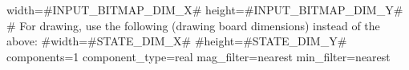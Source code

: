 width=#INPUT_BITMAP_DIM_X#
height=#INPUT_BITMAP_DIM_Y#
# For drawing, use the following (drawing board dimensions) instead of the above:
#width=#STATE_DIM_X#
#height=#STATE_DIM_Y#
components=1
component_type=real
mag_filter=nearest
min_filter=nearest
